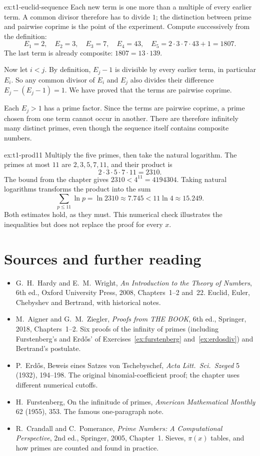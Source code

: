 \begin{solution}{ex:t1-euclid-sequence}
\idea Each new term is one more than a multiple of every earlier term. A common divisor therefore has to divide $1$; the distinction between prime and pairwise coprime is the point of the experiment.
\writeup Compute successively from the definition:
\[
E_1=2,\quad E_2=3,\quad E_3=7,\quad E_4=43,\quad
E_5=2\cdot3\cdot7\cdot43+1=1807.
\]
The last term is already composite: $1807=13\cdot139$.

Now let $i<j$. By definition, $E_j-1$ is divisible by every earlier term, in particular $E_i$. So any common divisor of $E_i$ and $E_j$ also divides their difference $E_j-(E_j-1)=1$. We have proved that the terms are pairwise coprime.

Each $E_j>1$ has a prime factor. Since the terms are pairwise coprime, a prime chosen from one term cannot occur in another. There are therefore infinitely many distinct primes, even though the sequence itself contains composite numbers.
\end{solution}

\begin{solution}{ex:t1-prod11}
\idea Multiply the five primes, then take the natural logarithm.
\writeup The primes at most $11$ are $2,3,5,7,11$, and their product is
\[
2\cdot3\cdot5\cdot7\cdot11=2310.
\]
The bound from the chapter gives $2310<4^{11}=4194304$. Taking natural logarithms transforms the product into the sum
\[
\sum_{p\le11}\ln p=\ln2310\approx7.745
<11\ln4\approx15.249.
\]
Both estimates hold, as they must. This numerical check illustrates the inequalities but does not replace the proof for every $x$.
\end{solution}

\section*{Sources and further reading}

\begin{itemize}
\item G.~H.~Hardy and E.~M.~Wright, \emph{An Introduction to the Theory of Numbers}, 6th ed., Oxford University Press, 2008, Chapters~1--2 and~22. Euclid, Euler, Chebyshev and Bertrand, with historical notes.
\item M.~Aigner and G.~M.~Ziegler, \emph{Proofs from THE BOOK}, 6th ed., Springer, 2018, Chapters~1--2. Six proofs of the infinity of primes (including Furstenberg's and Erd\H{o}s' of Exercises~\ref{ex:furstenberg} and~\ref{ex:erdosdiv}) and Bertrand's postulate.
\item P.~Erd\H{o}s, Beweis eines Satzes von Tschebyschef, \emph{Acta Litt.\ Sci.\ Szeged} 5 (1932), 194--198. The original binomial-coefficient proof; the chapter uses different numerical cutoffs.
\item H.~Furstenberg, On the infinitude of primes, \emph{American Mathematical Monthly} 62 (1955), 353. The famous one-paragraph note.
\item R.~Crandall and C.~Pomerance, \emph{Prime Numbers: A Computational Perspective}, 2nd ed., Springer, 2005, Chapter~1. Sieves, $\pi(x)$ tables, and how primes are counted and found in practice.
\end{itemize}
